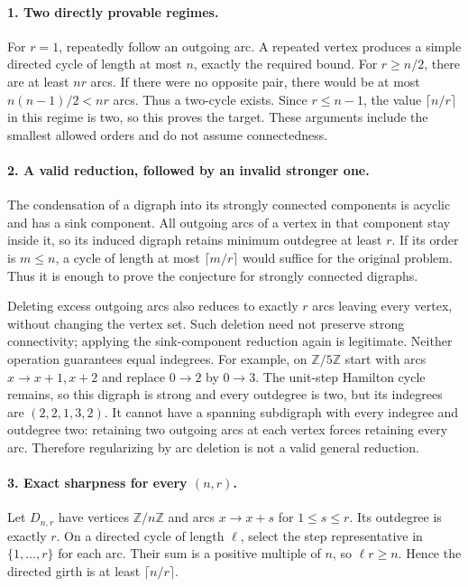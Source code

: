 \documentclass[11pt,a4paper]{article}
\begin{document}
\paragraph{1. Two directly provable regimes.}
For $r=1$, repeatedly follow an outgoing arc. A repeated vertex
produces a simple directed cycle of length at most $n$, exactly the
required bound. For $r\ge n/2$, there are at least $nr$ arcs. If
there were no opposite pair, there would be at most $n(n-1)/2<nr$
arcs. Thus a two-cycle exists. Since $r\le n-1$, the value
$\lceil n/r\rceil$ in this regime is two, so this proves the target.
These arguments include the smallest allowed orders and do not
assume connectedness.

\paragraph{2. A valid reduction, followed by an invalid stronger one.}
The condensation of a digraph into its strongly connected components
is acyclic and has a sink component. All outgoing arcs of a vertex
in that component stay inside it, so its induced digraph retains
minimum outdegree at least $r$. If its order is $m\le n$, a cycle
of length at most $\lceil m/r\rceil$ would suffice for the original
problem. Thus it is enough to prove the conjecture for strongly
connected digraphs.

Deleting excess outgoing arcs also reduces to exactly $r$ arcs
leaving every vertex, without changing the vertex set. Such deletion
need not preserve strong connectivity; applying the sink-component
reduction again is legitimate. Neither operation guarantees equal
indegrees. For example, on $\mathbb Z/5\mathbb Z$ start with arcs
$x\to x+1,x+2$ and replace $0\to2$ by $0\to3$. The unit-step
Hamilton cycle remains, so this digraph is strong and every outdegree
is two, but its indegrees are $(2,2,1,3,2)$. It cannot have a spanning
subdigraph with every indegree and outdegree two: retaining two
outgoing arcs at each vertex forces retaining every arc. Therefore
regularizing by arc deletion is not a valid general reduction.

\paragraph{3. Exact sharpness for every $(n,r)$.}
Let $D_{n,r}$ have vertices $\mathbb Z/n\mathbb Z$ and arcs
$x\to x+s$ for $1\le s\le r$. Its outdegree is exactly $r$.
On a directed cycle of length $\ell$, select the step representative
in $\{1,\ldots,r\}$ for each arc. Their sum is a positive multiple
of $n$, so $\ell r\ge n$. Hence the directed girth is at least
$\lceil n/r\rceil$.
\end{document}

